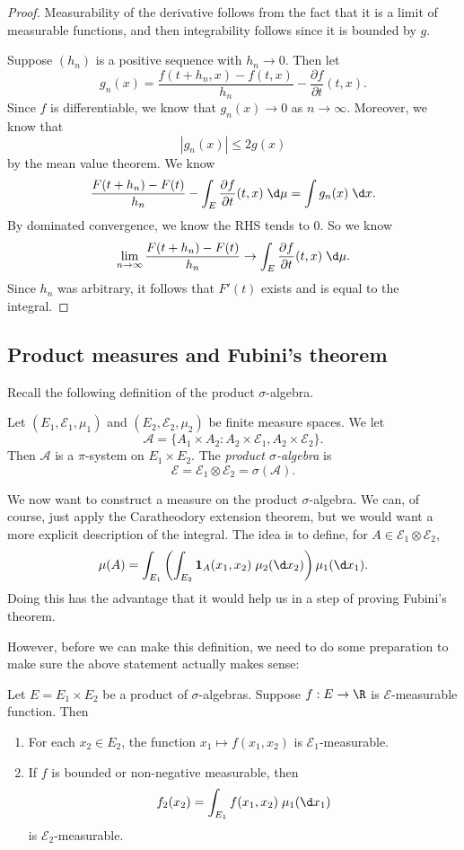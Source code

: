 \documentclass[a4paper]{article}
\begin{document}
\begin{proof}
  Measurability of the derivative follows from the fact that it is a limit of measurable functions, and then integrability follows since it is bounded by $g$.

  Suppose $(h_n)$ is a positive sequence with $h_n \to 0$. Then let
  \[
    g_n(x) = \frac{f(t + h_n, x) - f(t, x)}{h_n} - \frac{\partial f}{\partial t}(t, x).
  \]
  Since $f$ is differentiable, we know that $g_n(x) \to 0$ as $n \to \infty$. Moreover, we know that
  \[
    |g_n(x)| \leq 2g(x)
  \]
  by the mean value theorem. We know
  \[
    \frac{F(t + h_n) - F(t)}{h_n} - \int_E \frac{\partial f}{\partial t}(t, x) \;\d \mu = \int g_n(x)\;\d x.
  \]
  By dominated convergence, we know the RHS tends to $0$. So we know
  \[
    \lim_{n \to \infty} \frac{F(t + h_n) - F(t)}{h_n} \to \int_E \frac{\partial f}{\partial t}(t, x)\;\d \mu.
  \]
  Since $h_n$ was arbitrary, it follows that $F'(t)$ exists and is equal to the integral.
\end{proof}

\subsection{Product measures and Fubini's theorem}
Recall the following definition of the product $\sigma$-algebra.
\begin{defi}
  Let $(E_1, \mathcal{E}_1, \mu_1)$ and $(E_2, \mathcal{E}_2, \mu_2)$ be finite measure spaces. We let
  \[
    \mathcal{A} = \{A_1 \times A_2: A_2 \times \mathcal{E}_1, A_2 \times \mathcal{E}_2\}.
  \]
  Then $\mathcal{A}$ is a $\pi$-system on $E_1 \times E_2$. The \emph{product $\sigma$-algebra} is
  \[
    \mathcal{E} = \mathcal{E}_1 \otimes \mathcal{E}_2 = \sigma(\mathcal{A}).
  \]
\end{defi}
We now want to construct a measure on the product $\sigma$-algebra. We can, of course, just apply the Caratheodory extension theorem, but we would want a more explicit description of the integral. The idea is to define, for $A \in \mathcal{E}_1 \otimes \mathcal{E}_2$,
\[
  \mu(A) = \int_{E_1} \left(\int_{E_2} \mathbf{1}_A(x_1, x_2)\;\mu_2(\d x_2)\right)\mu_1(\d x_1).
\]
Doing this has the advantage that it would help us in a step of proving Fubini's theorem.

However, before we can make this definition, we need to do some preparation to make sure the above statement actually makes sense:
\begin{lemma}
  Let $E = E_1 \times E_2$ be a product of $\sigma$-algebras. Suppose $f: E \to \R$ is $\mathcal{E}$-measurable function. Then
  \begin{enumerate}
    \item For each $x_2 \in E_2$, the function $x_1 \mapsto f(x_1, x_2)$ is $\mathcal{E}_1$-measurable.
    \item If $f$ is bounded or non-negative measurable, then
      \[
        f_2(x_2) = \int_{E_1} f(x_1, x_2)\; \mu_1(\d x_1)
      \]
      is $\mathcal{E}_2$-measurable.
  \end{enumerate}
\end{lemma}
\end{document}
